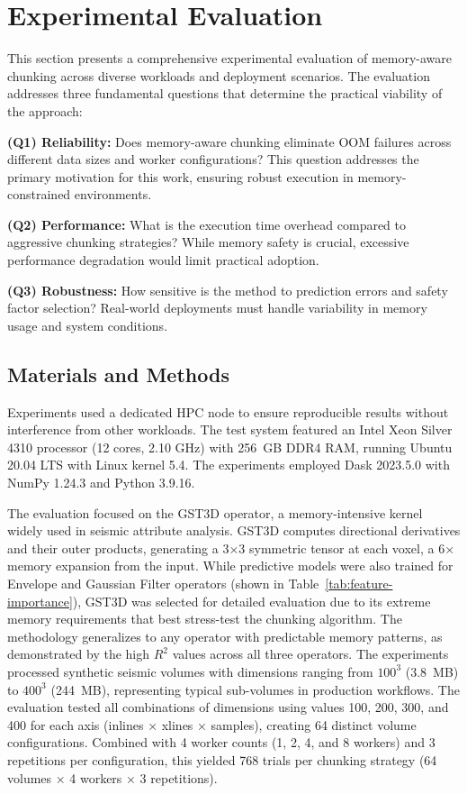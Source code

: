 \section{Experimental Evaluation}
\label{sec:experimental-results}

This section presents a comprehensive experimental evaluation of memory-aware chunking across diverse workloads and deployment scenarios.
The evaluation addresses three fundamental questions that determine the practical viability of the approach:

\textbf{(Q1) Reliability:} Does memory-aware chunking eliminate \ac{OOM} failures across different data sizes and worker configurations?
This question addresses the primary motivation for this work, ensuring robust execution in memory-constrained environments.

\textbf{(Q2) Performance:} What is the execution time overhead compared to aggressive chunking strategies?
While memory safety is crucial, excessive performance degradation would limit practical adoption.

\textbf{(Q3) Robustness:} How sensitive is the method to prediction errors and safety factor selection?
Real-world deployments must handle variability in memory usage and system conditions.

\subsection{Materials and Methods}

Experiments used a dedicated \ac{HPC} node to ensure reproducible results without interference from other workloads.
The test system featured an Intel Xeon Silver 4310 processor (12 cores, 2.10 GHz) with 256~\ac{GB} DDR4 \ac{RAM}, running Ubuntu 20.04 LTS with Linux kernel 5.4.
The experiments employed Dask 2023.5.0 with NumPy 1.24.3 and Python 3.9.16.

The evaluation focused on the \ac{GST3D} operator, a memory-intensive kernel widely used in seismic attribute analysis.
\ac{GST3D} computes directional derivatives and their outer products, generating a 3×3 symmetric tensor at each voxel, a 6× memory expansion from the input.
While predictive models were also trained for Envelope and Gaussian Filter operators (shown in Table~\ref{tab:feature-importance}), \ac{GST3D} was selected for detailed evaluation due to its extreme memory requirements that best stress-test the chunking algorithm.
The methodology generalizes to any operator with predictable memory patterns, as demonstrated by the high $R^2$ values across all three operators.
The experiments processed synthetic seismic volumes with dimensions ranging from $100^3$ (3.8~MB) to $400^3$ (244~MB), representing typical sub-volumes in production workflows.
The evaluation tested all combinations of dimensions using values 100, 200, 300, and 400 for each axis (inlines × xlines × samples), creating 64 distinct volume configurations.
Combined with 4 worker counts (1, 2, 4, and 8 workers) and 3 repetitions per configuration, this yielded 768 trials per chunking strategy (64 volumes × 4 workers × 3 repetitions).

